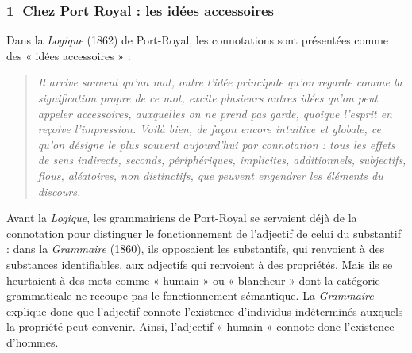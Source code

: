 \subsubsection*{\textcircled{\scriptsize 1} Chez Port Royal : les idées accessoires}
Dans la \textit{Logique} (1862) de Port-Royal, les connotations sont présentées comme des « idées accessoires » :
\begin{quote}\small\itshape
Il arrive souvent qu’un mot, outre l’idée principale qu’on regarde comme la signification propre de ce mot, excite plusieurs autres idées qu’on peut appeler accessoires, auxquelles on ne prend pas garde, quoique l’esprit en reçoive l’impression. Voilà bien, de façon encore intuitive et globale, ce qu’on désigne le plus souvent aujourd’hui par connotation : tous les effets de sens indirects, seconds, périphériques, implicites, additionnels, subjectifs, flous, aléatoires, non distinctifs, que peuvent engendrer les éléments du discours.
\end{quote}
Avant la \textit{Logique}, les grammairiens de Port-Royal se servaient déjà de la connotation pour distinguer le fonctionnement de l’adjectif de celui du substantif : dans la \textit{Grammaire} (1860), ils opposaient les substantifs, qui renvoient à des substances identifiables, aux adjectifs qui renvoient à des propriétés. Mais ils se heurtaient à des mots comme « humain » ou « blancheur » dont la catégorie grammaticale ne recoupe pas le fonctionnement sémantique. La \textit{Grammaire} explique donc que l’adjectif connote l’existence d’individus indéterminés auxquels la propriété peut convenir. Ainsi, l’adjectif « humain » connote donc l’existence d’hommes.

